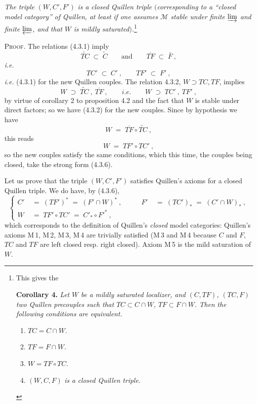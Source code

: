 \textit{The triple $(W,C',F')$ is a closed Quillen triple $($corresponding to a ``closed model category'' of Quillen, at least if one assumes $\mathcal{M}$ stable under finite $\varinjlim$ and finite $\varprojlim$, and that $W$ is mildly saturated$)$.}\footnote[13]{This gives the\par
\textbf{Corollary 4.} \textit{Let $W$ be a mildly saturated localizer, and $(C,TF)$, $(TC,F)$ two Quillen precouples such that $TC\subset C\cap W$, $TF\subset F\cap W$. Then the following conditions are equivalent.}
\begin{enumerate}[leftmargin=*]
\item[a)] $TC=C\cap W$.
\item[b)] $TF=F\cap W$.
\item[c)] $W=TF\circ TC$.
\item[d)] $(W,C,F)$ \textit{is a closed Quillen triple.}
\end{enumerate}}

\textsc{Proof.} The relations (4.3.1) imply
\[
\widetilde{TC}\;\subset\;\widetilde{C}\qquad\text{and}\qquad\overline{TF}\;\subset\;\bar{F}\ ,
\]
\textit{i.e.}
\[
TC'\;\subset\;C'\ ,\qquad TF'\;\subset\;F'\ ,
\]
\textit{i.e.} (4.3.1) for the new Quillen couples. The relation 4.3.2, $W\supset TC,TF$, implies
\[
W\;\supset\;\widetilde{TC}\ ,\ \overline{TF}\ ,\qquad \textit{i.e.}\qquad W\;\supset\;TC'\ ,\ TF'\ ,
\]
by virtue of corollary 2 to proposition 4.2 and the fact that $W$ is stable under direct factors; so we have (4.3.2) for the new couples. Since by hypothesis we have
\[
W\;=\;\overline{TF}\circ\widetilde{TC}\ ,
\]
this reads
\[
W\;=\;TF'\circ TC'\ ,
\]
so the new couples satisfy the same conditions, which this time, the couples being closed, take the strong form (4.3.6).

Let us prove that the triple $(W,C',F')$ satisfies Quillen's axioms for a closed Quillen triple. We do have, by (4.3.6),
\[
\left\{
\begin{aligned}
C' &\;=\;(TF')^*\;=\;(F'\cap W)^*\ , &\qquad F' &\;=\;(TC')_*\;=\;(C'\cap W)_*\ ,\\
W &\;=\;TF'\circ TC'\;=\;C'_*\circ F'^*\ ,
\end{aligned}
\right.
\]
which corresponds to the definition of Quillen's \textit{closed} model categories: Quillen's axioms M\,1, M\,2, M\,3, M\,4 are trivially satisfied (M\,3 and M\,4 because
$C$ and $F$, $TC$ and $TF$ are left closed resp. right closed). Axiom M\,5 is the mild saturation of $W$.

